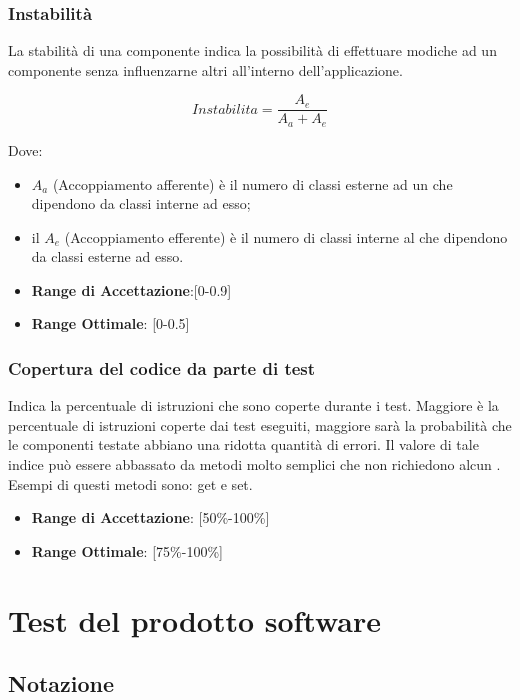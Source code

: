 \documentclass[12pt,a4paper]{article}
\begin{document}
	\subsubsection{Instabilità}
	La stabilità di una componente indica la possibilità di effettuare modiche ad un componente senza influenzarne altri all'interno dell'applicazione.
	
	\[Instabilita=\frac{A_e}{A_a+A_e}\]
	
	Dove: \begin{itemize}
		\item $A_a$ (Accoppiamento afferente) è il numero di classi esterne ad un  che dipendono da classi interne ad esso;
		\item il $A_e$ (Accoppiamento efferente) è il numero di classi interne al  che dipendono da classi esterne ad esso.
	\end{itemize}  
	
	\begin{itemize}
		\item \textbf{Range di Accettazione}:[0-0.9]
		\item \textbf{Range Ottimale}: [0-0.5]
	\end{itemize}
	
	\subsubsection{Copertura del codice da parte di test}
	Indica la percentuale di istruzioni che sono coperte durante i test. Maggiore è la percentuale di istruzioni coperte dai test eseguiti, maggiore sarà la probabilità che le componenti testate abbiano una ridotta quantità di errori. Il valore di tale indice può essere abbassato da metodi molto semplici che non richiedono alcun . Esempi di questi metodi sono: get e set.
	
	\begin{itemize}
		\item \textbf{Range di Accettazione}: [50\%-100\%]
		\item \textbf{Range Ottimale}: [75\%-100\%]
	\end{itemize}
	
	\newpage
	
	\section{Test del prodotto software}\label{test}
	\subsection{Notazione}
\end{document}
